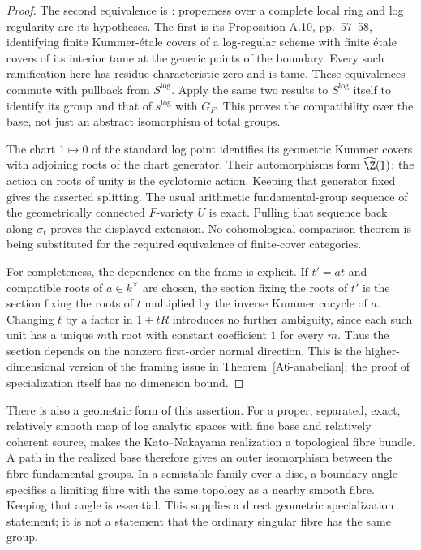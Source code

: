 \begin{proof}
The second equivalence is \cite[Corollary 3.9, pp.\ 31--32 of the July 2006 preprint]{HoshiLog2009A567}: properness over a complete local ring and log regularity are its hypotheses. The first is its Proposition A.10, pp.\ 57--58, identifying finite Kummer-étale covers of a log-regular scheme with finite étale covers of its interior tame at the generic points of the boundary. Every such ramification here has residue characteristic zero and is tame. These equivalences commute with pullback from $S^{\log}$. Apply the same two results to $S^{\log}$ itself to identify its group and that of $s^{\log}$ with $G_F$. This proves the compatibility over the base, not just an abstract isomorphism of total groups.

The chart $1\mapsto0$ of the standard log point identifies its geometric Kummer covers with adjoining roots of the chart generator. Their automorphisms form $\widehat{\Z}(1)$; the action on roots of unity is the cyclotomic action. Keeping that generator fixed gives the asserted splitting. The usual arithmetic fundamental-group sequence of the geometrically connected $F$-variety $U$ is exact. Pulling that sequence back along $\sigma_t$ proves the displayed extension. No cohomological comparison theorem is being substituted for the required equivalence of finite-cover categories.

For completeness, the dependence on the frame is explicit. If $t'=at$ and compatible roots of $a\in k^\times$ are chosen, the section fixing the roots of $t'$ is the section fixing the roots of $t$ multiplied by the inverse Kummer cocycle of $a$. Changing $t$ by a factor in $1+tR$ introduces no further ambiguity, since each such unit has a unique $m$th root with constant coefficient $1$ for every $m$. Thus the section depends on the nonzero first-order normal direction. This is the higher-dimensional version of the framing issue in Theorem~\ref{A6-anabelian}; the proof of specialization itself has no dimension bound.
\end{proof}

There is also a geometric form of this assertion. For a proper, separated, exact, relatively smooth map of log analytic spaces with fine base and relatively coherent source, \cite[Theorem 5.1, p.\ 2226]{NakayamaOgus2010A567} makes the Kato--Nakayama realization a topological fibre bundle. A path in the realized base therefore gives an outer isomorphism between the fibre fundamental groups. In a semistable family over a disc, a boundary angle specifies a limiting fibre with the same topology as a nearby smooth fibre. Keeping that angle is essential. This supplies a direct geometric specialization statement; it is not a statement that the ordinary singular fibre has the same group.

